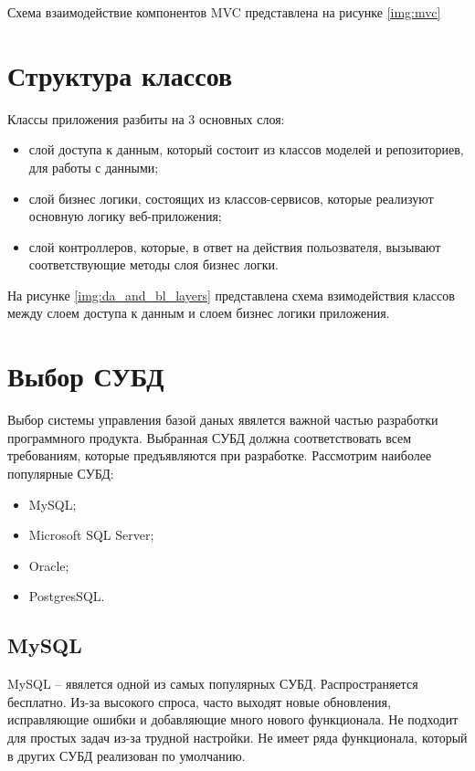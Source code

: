 Схема взаимодействие компонентов MVC представлена на рисунке \ref{img:mvc}


\section{Структура классов}

Классы приложения разбиты на 3 основных слоя:

\begin{itemize}
    \item слой доступа к данным, который состоит из классов моделей и репозиториев, для работы с данными;
    \item слой бизнес логики, состоящих из классов-сервисов, которые реализуют основную логику веб-приложения;
    \item слой контроллеров, которые, в ответ на действия польозвателя, вызывают соответствующие методы слоя бизнес логки.
\end{itemize}

На рисунке \ref{img:da_and_bl_layers} представлена схема взимодействия классов между слоем доступа к данным и слоем бизнес логики приложения. 

\newpage


\section{Выбор СУБД}

Выбор системы управления базой даных явялется важной частью разработки программного продукта. Выбранная СУБД должна соответствовать всем требованиям, которые предъявляются при разработке. Рассмотрим наиболее популярные СУБД:

\begin{itemize}
    \item MySQL;
    \item Microsoft SQL Server;
    \item Oracle;
    \item PostgresSQL.
\end{itemize}

\subsection{MySQL}

MySQL \cite{mysql} -- явялется одной из самых популярных СУБД. Распространяется бесплатно. Из-за высокого спроса, часто выходят новые обновления, исправляющие ошибки и добавляющие много нового функционала. Не подходит для простых задач из-за трудной настройки. Не имеет ряда функционала, который в других СУБД реализован по умолчанию.

